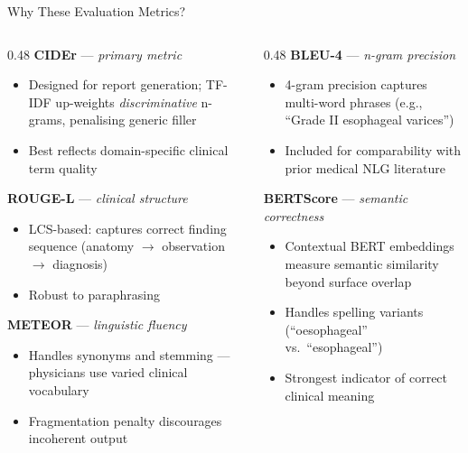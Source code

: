 ﻿\documentclass[aspectratio=169]{beamer}
\begin{document}
\begin{frame}{Why These Evaluation Metrics?}
\begin{columns}[T]
\begin{column}{0.48\textwidth}
\small\textbf{CIDEr} --- \textit{primary metric}
\begin{itemize}\setlength\itemsep{0pt}
    \item Designed for report generation; TF-IDF up-weights \textit{discriminative} n-grams, penalising generic filler
    \item Best reflects domain-specific clinical term quality
\end{itemize}
\textbf{ROUGE-L} --- \textit{clinical structure}
\begin{itemize}\setlength\itemsep{0pt}
    \item LCS-based: captures correct finding sequence (anatomy $\to$ observation $\to$ diagnosis)
    \item Robust to paraphrasing
\end{itemize}
\textbf{METEOR} --- \textit{linguistic fluency}
\begin{itemize}\setlength\itemsep{0pt}
    \item Handles synonyms and stemming --- physicians use varied clinical vocabulary
    \item Fragmentation penalty discourages incoherent output
\end{itemize}
\end{column}
\begin{column}{0.48\textwidth}
\small\textbf{BLEU-4} --- \textit{n-gram precision}
\begin{itemize}\setlength\itemsep{0pt}
    \item 4-gram precision captures multi-word phrases (e.g., ``Grade II esophageal varices'')
    \item Included for comparability with prior medical NLG literature
\end{itemize}
\textbf{BERTScore} --- \textit{semantic correctness}
\begin{itemize}\setlength\itemsep{0pt}
    \item Contextual BERT embeddings measure semantic similarity beyond surface overlap
    \item Handles spelling variants (``oesophageal'' vs.\ ``esophageal'')
    \item Strongest indicator of correct clinical meaning
\end{itemize}
\end{column}
\end{columns}
\end{frame}
\end{document}
